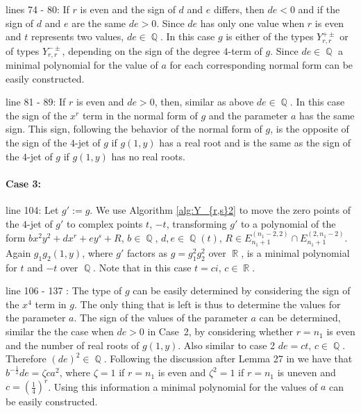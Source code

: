 \documentclass[noend]{amsproc}
\theoremstyle{definition}
\DeclareMathOperator{\Q}{\mathbb{Q}}
\DeclareMathOperator{\R}{\mathbb{R}}
\begin{document}
lines 74 - 80: If $r$ is even and the sign of $d$ and $e$ differs, then $de<0$ and if the sign of $d$ and $e$ are the same $de>0$. Since $de$ has only one value when $r$ is even and $t$ represents two values, $de\in\Q$. In this case $g$ is either of the types $Y_{r,r}^{+\pm}$ or of types $Y_{r,r}^{-\pm}$, depending on the sign of the degree $4$-term of $g$. Since $de\in\Q$ a minimal polynomial for the value of $a$ for each corresponding normal form can be easily constructed.

line 81 - 89: If $r$ is even and $de>0$, then, similar as above $de\in\Q$. In this case the sign of the $x^r$ term in the normal form of $g$ and the parameter $a$ has the same sign. This sign, following the behavior of the normal form of $g$, is the opposite of the sign of the $4$-jet of $g$ if $g(1,y)$ has a real root and is the same as the sign of the $4$-jet of $g$ if $g(1,y)$ has no real roots. 

\paragraph{Case 3:} line 104: Let $g':=g$. We use Algorithm \ref{alg:Y_{r,s}2} to move the zero points of the $4$-jet of $g'$ to complex points $t$, $-t$, transforming $g'$ to a polynomial of the form $bx^2y^2+dx^r+ey^s+R$, $b\in\Q$, $d,e\in\Q(t)$, $R\in E_{n_1+1}^{(n_1-2,2)}\cap E_{n_1+1}^{(2,n_1-2)}$. Again $g_1g_2(1,y)$, where $g'$ factors as $g=g_1^2g_2^2$ over $\R$, is a minimal polynomial for $t$ and $-t$ over $\Q$. Note that in this case $t=ci$, $c\in\R$. 

line 106 - 137 : The type of $g$ can be easily determined by considering the sign of the $x^4$ term in $g$.  The only thing that is left is thus to determine the values for the parameter $a$. The sign of the values of the parameter $a$ can be determined, similar the the case when $de>0$ in Case~2, by considering whether $r=n_1$ is even and the number of real roots of $g(1,y)$. Also similar to case 2 $de=ct$, $c\in\Q$. Therefore $(de)^2\in\Q$. Following the discussion after Lemma 27 in \cite{realclassify2} we have that $b^{-\frac{1}{2}}de=\zeta ca^2$, where $\zeta = 1$ if $r=n_1$ is even and $\zeta^2=1$ if $r=n_1$ is uneven and $c=\left(\frac{1}{4}\right)^{r}$. Using this information a minimal polynomial for the values of $a$ can be easily constructed. 
\end{document}
